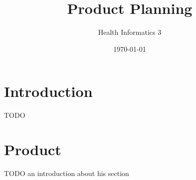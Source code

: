 \documentclass[a4paper]{article}
\title{Product Planning}
\author{Health Informatics 3}
\date{\today}
\begin{document}
\maketitle

\section{Introduction}
TODO
\section{Product}
TODO an introduction about his section 


\end{document}
